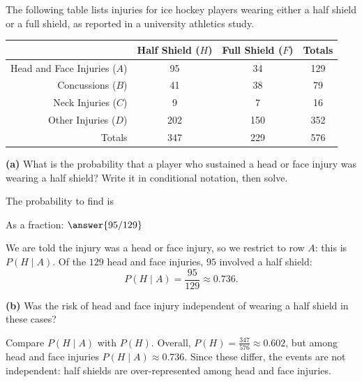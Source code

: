 \documentclass[12pt]{ximera}
\begin{document}
\begin{problem}
The following table lists injuries for ice hockey players wearing either a half shield
or a full shield, as reported in a university athletics study.

\begin{center}
\begin{tabular}{r|cc|c}
 & Half Shield ($H$) & Full Shield ($F$) & Totals\\\hline
Head and Face Injuries ($A$) & 95 & 34 & 129\\
Concussions ($B$) & 41 & 38 & 79\\
Neck Injuries ($C$) & 9 & 7 & 16\\
Other Injuries ($D$) & 202 & 150 & 352\\\hline
Totals & 347 & 229 & 576
\end{tabular}
\end{center}

\begin{prompt}
\textbf{(a)} What is the probability that a player who sustained a head or face injury
was wearing a half shield? Write it in conditional notation, then solve.

The probability to find is
\begin{multipleChoice}
\end{multipleChoice}

As a fraction: $\answer{95/129}$

\begin{feedback}
We are told the injury was a head or face injury, so we restrict to row $A$: this is
$P(H\mid A)$. Of the $129$ head and face injuries, $95$ involved a half shield:
\[ P(H\mid A)=\frac{95}{129}\approx 0.736. \]
\end{feedback}
\end{prompt}

\begin{prompt}
\textbf{(b)} Was the risk of head and face injury independent of wearing a half shield
in these cases?

\begin{multipleChoice}
\end{multipleChoice}

\begin{feedback}
Compare $P(H\mid A)$ with $P(H)$. Overall, $P(H)=\frac{347}{576}\approx 0.602$, but among
head and face injuries $P(H\mid A)\approx 0.736$. Since these differ, the events are not
independent: half shields are over-represented among head and face injuries.
\end{feedback}
\end{prompt}
\end{problem}
\end{document}
